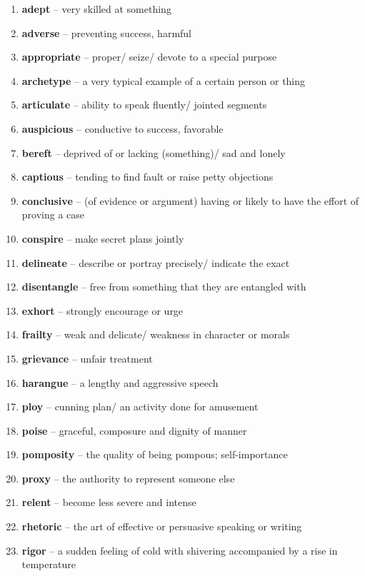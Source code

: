 \begin{enumerate}[wide,labelindent=0pt]
\item \textbf{adept} -- very skilled at something
\item \textbf{adverse} -- preventing success, harmful
\item \textbf{appropriate} -- proper/ seize/ devote to a special purpose
\item \textbf{archetype} -- a very typical example of a certain person or thing
\item \textbf{articulate} -- ability to speak fluently/ jointed segments
\item \textbf{auspicious} -- conductive to success, favorable
\item \textbf{bereft} -- deprived of or lacking (something)/ sad and lonely
\item \textbf{captious} -- tending to find fault or raise petty objections
\item \textbf{conclusive} -- (of evidence or argument) having or likely to have the effort of proving a case
\item \textbf{conspire} -- make secret plans jointly
\item \textbf{delineate} -- describe or portray precisely/ indicate the exact
\item \textbf{disentangle} -- free from something that they are entangled with
\item \textbf{exhort} -- strongly encourage or urge
\item \textbf{frailty} -- weak and delicate/ weakness in character or morals
\item \textbf{grievance} -- unfair treatment
\item \textbf{harangue} -- a lengthy and aggressive speech
\item \textbf{ploy} -- cunning plan/ an activity done for amusement
\item \textbf{poise} -- graceful, composure and dignity of manner
\item \textbf{pomposity} -- the quality of being pompous; self-importance
\item \textbf{proxy} -- the authority to represent someone else
\item \textbf{relent} -- become less severe and intense
\item \textbf{rhetoric} -- the art of effective or persuasive speaking or writing
\item \textbf{rigor} -- a sudden feeling of cold with shivering accompanied by a rise in temperature

\end{enumerate}
